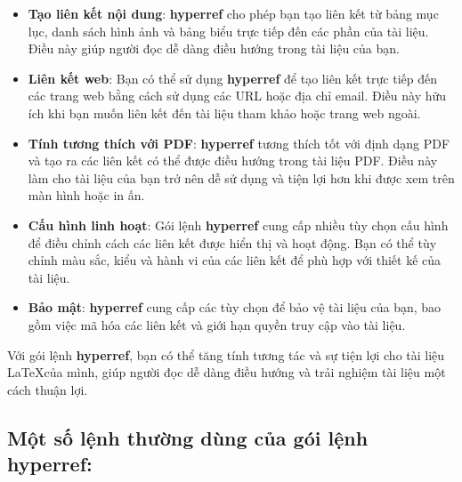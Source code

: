 \documentclass[a4paper,12pt]{article}
\begin{document}
\begin{itemize}
    \item \textbf{Tạo liên kết nội dung}: \textbf{hyperref} cho phép bạn tạo liên kết từ bảng mục lục, danh sách hình ảnh và bảng biểu trực tiếp đến các phần của tài liệu. Điều này giúp người đọc dễ dàng điều hướng trong tài liệu của bạn.
    
    \item \textbf{Liên kết web}: Bạn có thể sử dụng \textbf{hyperref} để tạo liên kết trực tiếp đến các trang web bằng cách sử dụng các URL hoặc địa chỉ email. Điều này hữu ích khi bạn muốn liên kết đến tài liệu tham khảo hoặc trang web ngoài.
    
    \item \textbf{Tính tương thích với PDF}: \textbf{hyperref} tương thích tốt với định dạng PDF và tạo ra các liên kết có thể được điều hướng trong tài liệu PDF. Điều này làm cho tài liệu của bạn trở nên dễ sử dụng và tiện lợi hơn khi được xem trên màn hình hoặc in ấn.
    
    \item \textbf{Cấu hình linh hoạt}: Gói lệnh \textbf{hyperref} cung cấp nhiều tùy chọn cấu hình để điều chỉnh cách các liên kết được hiển thị và hoạt động. Bạn có thể tùy chỉnh màu sắc, kiểu và hành vi của các liên kết để phù hợp với thiết kế của tài liệu.
    
    \item \textbf{Bảo mật}: \textbf{hyperref} cung cấp các tùy chọn để bảo vệ tài liệu của bạn, bao gồm việc mã hóa các liên kết và giới hạn quyền truy cập vào tài liệu.
\end{itemize}

Với gói lệnh \textbf{hyperref}, bạn có thể tăng tính tương tác và sự tiện lợi cho tài liệu \LaTeX của mình, giúp người đọc dễ dàng điều hướng và trải nghiệm tài liệu một cách thuận lợi.
\newpage
\subsection*{Một số lệnh thường dùng của gói lệnh \textbf{hyperref}:}
\end{document}
